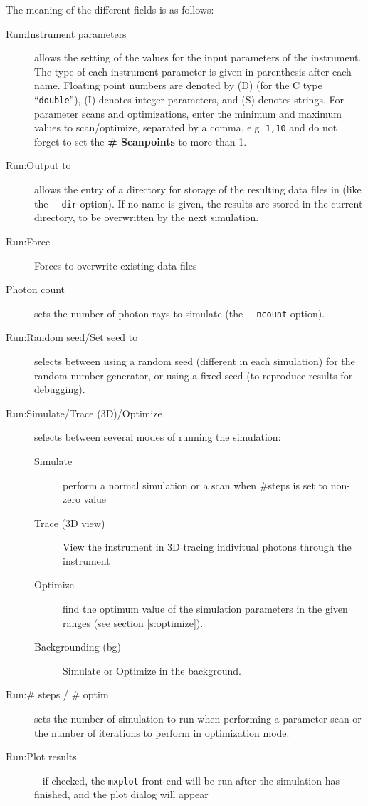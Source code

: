 The meaning of the different fields is as follows:
\begin{description}
\item[Run:Instrument parameters] allows the setting of the values for
  the input parameters of the instrument. The type of each instrument
  parameter is given in parenthesis after each name. Floating point
  numbers are denoted by (D) (for the C type ``\verb+double+''), (I)
  denotes integer parameters, and (S) denotes strings. For parameter scans and optimizations, enter the minimum and maximum values to scan/optimize, separated by a comma, e.g. \verb+1,10+ and do not forget to set the {\bfseries \# Scanpoints} to more than 1.
\item[Run:Output to] allows the entry of a directory for storage of the
  resulting data files in (like the \verb+--dir+ option). If no name is
  given, the results are stored in the current directory, to be overwritten
  by the next simulation.
\item[Run:Force] Forces to overwrite existing data files
\item[Photon count] sets the number of photon rays to
  simulate (the \verb+--ncount+ option).
\item[Run:Random seed/Set seed to] selects between using a random seed (different
  in each simulation) for the random number generator, or using a fixed
  seed (to reproduce results for debugging).
\item[Run:Simulate/Trace (3D)/Optimize] selects between several modes of
  running the simulation:
  \begin{description}
  \item[Simulate] perform a normal simulation or a scan when \#steps
    is set to non-zero value
  \item[Trace (3D view)] View the instrument in 3D tracing indivitual
    photons through the instrument
  \item[Optimize] find the optimum value of the simulation parameters
    in the given ranges (see section \ref{s:optimize}).
  \item [Backgrounding (bg)] Simulate or Optimize in the background.
  \end{description}
\item[Run:\# steps / \# optim] sets the number of simulation to run when
  performing a parameter scan or the number of iterations to
  perform in optimization mode.
\item[Run:Plot results] -- if checked, the \verb+mxplot+ front-end will be run
  after the simulation has finished, and the plot dialog will appear

\end{description}
